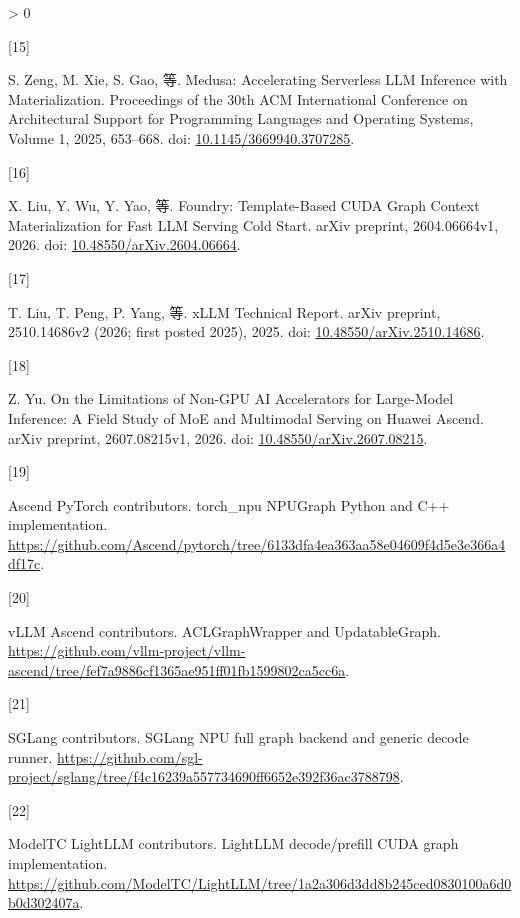 \documentclass[
  UTF8,
  zihao=5]{ctexart}
\newlength{\cslhangindent}
\newlength{\csllabelwidth}
\newenvironment{CSLReferences}[2] %
 {%
  \setlength{\parindent}{0pt}
  \ifodd #1 \everypar{\setlength{\hangindent}{\cslhangindent}}\ignorespaces\fi
  \ifnum #2 > 0
  \setlength{\parskip}{#2\baselineskip}
  \fi
 }%
 {}
\newcommand{\CSLLeftMargin}[1]{\parbox[t]{\csllabelwidth}{#1}}
\newcommand{\CSLRightInline}[1]{\parbox[t]{\linewidth - \csllabelwidth}{#1}\par}
\begin{document}
\begin{CSLReferences}{0}{0}
\leavevmode{}%
\CSLLeftMargin{{[}15{]} }%
\CSLRightInline{S. Zeng, M. Xie, S. Gao, 等. Medusa: Accelerating
Serverless LLM Inference with Materialization. Proceedings of the 30th
ACM International Conference on Architectural Support for Programming
Languages and Operating Systems, Volume 1, 2025, 653--668. doi:
\href{https://doi.org/10.1145/3669940.3707285}{10.1145/3669940.3707285}.}

\leavevmode{}%
\CSLLeftMargin{{[}16{]} }%
\CSLRightInline{X. Liu, Y. Wu, Y. Yao, 等. Foundry: Template-Based CUDA
Graph Context Materialization for Fast LLM Serving Cold Start. arXiv
preprint, 2604.06664v1, 2026. doi:
\href{https://doi.org/10.48550/arXiv.2604.06664}{10.48550/arXiv.2604.06664}.}

\leavevmode{}%
\CSLLeftMargin{{[}17{]} }%
\CSLRightInline{T. Liu, T. Peng, P. Yang, 等. {xLLM Technical Report}.
arXiv preprint, 2510.14686v2 (2026; first posted 2025), 2025. doi:
\href{https://doi.org/10.48550/arXiv.2510.14686}{10.48550/arXiv.2510.14686}.}

\leavevmode{}%
\CSLLeftMargin{{[}18{]} }%
\CSLRightInline{Z. Yu. {On the Limitations of Non-GPU AI Accelerators
for Large-Model Inference: A Field Study of MoE and Multimodal Serving
on Huawei Ascend}. arXiv preprint, 2607.08215v1, 2026. doi:
\href{https://doi.org/10.48550/arXiv.2607.08215}{10.48550/arXiv.2607.08215}.}

\leavevmode{}%
\CSLLeftMargin{{[}19{]} }%
\CSLRightInline{Ascend PyTorch contributors. {torch\_npu NPUGraph Python
and C++ implementation}.
\url{https://github.com/Ascend/pytorch/tree/6133dfa4ea363aa58e04609f4d5e3e366a4df17c}.}

\leavevmode{}%
\CSLLeftMargin{{[}20{]} }%
\CSLRightInline{vLLM Ascend contributors. {ACLGraphWrapper and
UpdatableGraph}.
\url{https://github.com/vllm-project/vllm-ascend/tree/fef7a9886cf1365ae951ff01fb1599802ca5cc6a}.}

\leavevmode{}%
\CSLLeftMargin{{[}21{]} }%
\CSLRightInline{SGLang contributors. {SGLang NPU full graph backend and
generic decode runner}.
\url{https://github.com/sgl-project/sglang/tree/f4c16239a557734690ff6652e392f36ac3788798}.}

\leavevmode{}%
\CSLLeftMargin{{[}22{]} }%
\CSLRightInline{ModelTC LightLLM contributors. {LightLLM decode/prefill
CUDA graph implementation}.
\url{https://github.com/ModelTC/LightLLM/tree/1a2a306d3dd8b245ced0830100a6d0b0d302407a}.}


\end{CSLReferences}
\end{document}
